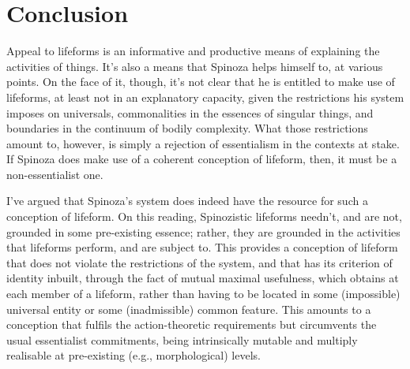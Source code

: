 \documentclass{article}
\begin{document}
\section{Conclusion}\label{sec:Conclusion}
Appeal to lifeforms is an informative and productive means of explaining the activities of things. It's also a means that Spinoza helps himself to, at various points. On the face of it, though, it's not clear that he is entitled to make use of lifeforms, at least not in an explanatory capacity, given the restrictions his system imposes on universals, commonalities in the essences of singular things, and boundaries in the continuum of bodily complexity. What those restrictions amount to, however, is simply a rejection of essentialism in the contexts at stake. If Spinoza does make use of a coherent conception of lifeform, then, it must be a non-essentialist one.

I've argued that Spinoza's system does indeed have the resource for such a conception of lifeform. On this reading, Spinozistic lifeforms needn't, and are not, grounded in some pre-existing essence; rather, they are grounded in the activities that lifeforms perform, and are subject to. This provides a conception of lifeform that does not violate the restrictions of the system, and that has its criterion of identity inbuilt, through the fact of mutual maximal usefulness, which obtains at each member of a lifeform, rather than having to be located in some (impossible) universal entity or some (inadmissible) common feature. This amounts to a conception that fulfils the action-theoretic requirements but circumvents the usual essentialist commitments, being intrinsically mutable and multiply realisable at pre-existing (e.g., morphological) levels.

\printbibliography{}
\end{document}
